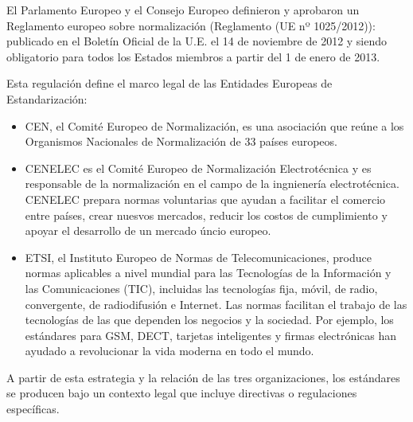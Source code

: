 El Parlamento Europeo y el Consejo Europeo definieron y aprobaron un Reglamento europeo sobre normalización (Reglamento (UE nº 1025/2012)): publicado en el Boletín Oficial de la U.E. el 14 de noviembre de 2012 y siendo obligatorio para todos los Estados miembros a partir del 1 de enero de 2013.

Esta regulación define el marco legal de las Entidades Europeas de Estandarización:
\begin{itemize}
    \item CEN, el Comité Europeo de Normalización, es una asociación que reúne a los Organismos Nacionales de Normalización de 33 países europeos.
    \item CENELEC es el Comité Europeo de Normalización Electrotécnica y es responsable de la normalización en el campo de la ingnienería electrotécnica. CENELEC prepara normas voluntarias que ayudan a facilitar el comercio entre países, crear nuesvos mercados, reducir los costos de cumplimiento y apoyar el desarrollo de un mercado úncio europeo.
    \item ETSI, el Instituto Europeo de Normas de Telecomunicaciones, produce normas aplicables a nivel mundial para las Tecnologías de la Información y las Comunicaciones (TIC), incluidas las tecnologías fija, móvil, de radio, convergente, de radiodifusión e Internet. Las normas facilitan el trabajo de las tecnologías de las que dependen los negocios y la sociedad. Por ejemplo, los estándares para GSM, DECT, tarjetas inteligentes y firmas electrónicas han ayudado a revolucionar la vida moderna en todo el mundo.
\end{itemize}

A partir de esta estrategia y la relación de las tres organizaciones, los estándares se producen bajo un contexto legal que incluye directivas o regulaciones específicas.